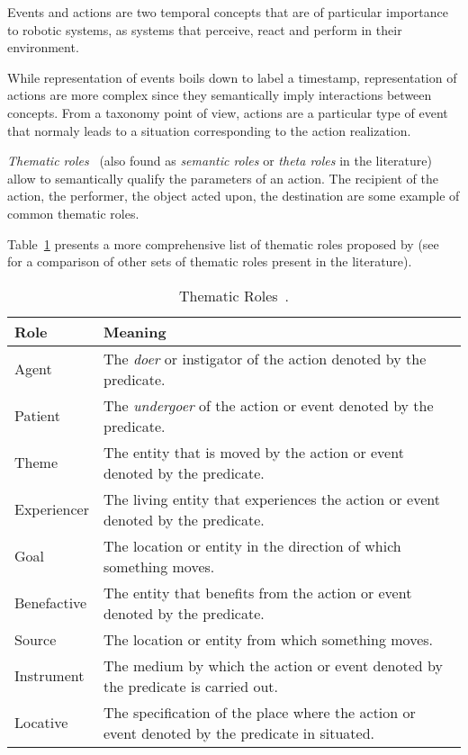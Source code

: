 Events and actions are two temporal concepts that are of particular importance to
robotic systems, as systems that perceive, react and perform in their environment.

While representation of events boils down to label a timestamp,
representation of actions are more complex since they semantically imply
interactions between concepts. From a taxonomy point of view, actions are a
particular type of event that normaly leads to a situation corresponding to the
action realization.


\emph{Thematic roles}~\cite{Gruber1965} (also found as \emph{semantic roles} or
\emph{theta roles} in the literature) allow to semantically qualify the
parameters of an action. The recipient of the action, the performer, the object
acted upon, the destination are some example of common thematic roles.

Table~\ref{table|theta-roles} presents a more comprehensive list of thematic
roles proposed by \cite{Aarts1997} (see~\cite{Gutierrez2001} for a comparison
of other sets of thematic roles present in the literature).

\begin{table}
\begin{center}

\begin{tabular}{lp{12cm}}

\toprule
       Role & Meaning \\
\midrule
      Agent & The \emph{doer} or instigator of the action denoted by the predicate. \\
    Patient & The \emph{undergoer} of the action or event denoted by the predicate. \\
      Theme & The entity that is moved by the action or event denoted by the predicate. \\
Experiencer & The living entity that experiences the action or event denoted by the predicate. \\
       Goal & The location or entity in the direction of which something moves. \\
Benefactive & The entity that benefits from the action or event denoted by the predicate. \\
     Source & The location or entity from which something moves. \\
 Instrument & The medium by which the action or event denoted by the predicate is carried out. \\
   Locative & The specification of the place where the action or event denoted by the predicate in situated. \\
\bottomrule

\end{tabular}
\end{center}
\caption{Thematic Roles~\cite{Aarts1997}.}
\label{table|theta-roles}
\end{table}

